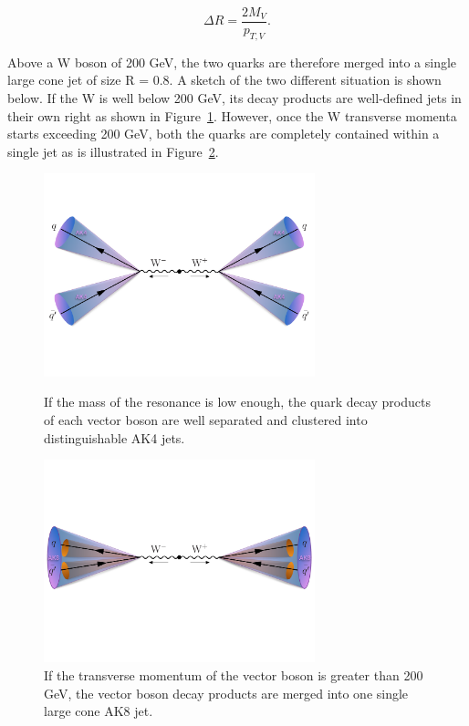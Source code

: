 \begin{equation}  
\Delta R = \frac{2 M_{V}}{p_{T,V}}.  
\end{equation}

Above a W boson \PT of 200 GeV, the two quarks are therefore merged into a single large cone jet of size R = 0.8. A sketch of the two different situation is shown below. If the W \PT is well below 200 GeV, its decay products are well-defined jets in their own right as shown in Figure~\ref{fig:objreco:unmerged}. However, once the W transverse momenta starts exceeding 200 GeV, both the quarks are completely contained within a single jet as is illustrated in Figure~\ref{fig:objreco:merged}.
   
\begin{figure}[ht] 
    \centering
    \includegraphics[width=0.70\textwidth]{figures/event_reconstruction/WWqqqq_unmerged_small.pdf}\\
    \caption{If the mass of the resonance is low enough, the quark decay products of each vector boson are well separated and clustered into distinguishable AK4 jets.}
    \label{fig:objreco:unmerged}
\end{figure}

\begin{figure}[ht] 
    \centering
    \includegraphics[width=0.70\textwidth]{figures/event_reconstruction/WWqqqq_merged_small.pdf}
    \caption{If the transverse momentum of the vector boson is greater than 200 GeV, the vector boson decay products are merged into one single large cone AK8 jet.}
    \label{fig:objreco:merged}
\end{figure}

